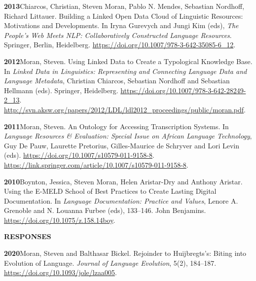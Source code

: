 \documentclass[11pt]{article}
\newcommand{\hangpara}{
 \setlength{\parindent}{0in} %
 \hangindent=0.42in %
}
\begin{document}
\vskip 6pt
\hangpara
{\bf 2013}\hspace{1ex}Chiarcos, Christian, Steven Moran, Pablo N. Mendes, Sebastian Nordhoff, Richard Littauer. Building a Linked Open Data Cloud of Linguistic Resources: Motivations and Developments. In Iryna Gurevych and Jungi Kim (eds), {\it The People's Web Meets NLP: Collaboratively Constructed Language Resources}. Springer, Berlin, Heidelberg. \url{https://doi.org/10.1007/978-3-642-35085-6_12}.


\vskip 6pt
\hangpara
{\bf 2012}\hspace{1ex}Moran, Steven. Using Linked Data to Create a Typological Knowledge Base. In {\it Linked Data in Linguistics: Representing and Connecting Language Data and Language Metadata}, Christian Chiarcos, Sebastian Nordhoff and Sebastian Hellmann (eds). Springer, Heidelberg. \url{https://doi.org/10.1007/978-3-642-28249-2_13}. \url{http://svn.aksw.org/papers/2012/LDL/ldl2012_proceedings/public/moran.pdf}.

\vskip 6pt
\hangpara
{\bf 2011}\hspace{1ex}Moran, Steven. An Ontology for Accessing Transcription Systems. In {\it Language Resources \& Evaluation: Special Issue on African Language Technology}, Guy De Pauw, Laurette Pretorius, Gilles-Maurice de Schryver and Lori Levin (eds). \url{https://doi.org/10.1007/s10579-011-9158-8}. \url{https://link.springer.com/article/10.1007/s10579-011-9158-8}.%

\vskip 6pt
\hangpara
{\bf 2010}\hspace{1ex}Boynton, Jessica, Steven Moran, Helen Aristar-Dry and Anthony Aristar. Using the E-MELD School of Best Practices to Create Lasting Digital Documentation. In {\it Language Documentation: Practice and Values}, Lenore A. Grenoble and N. Louanna Furbee (eds), 133--146. John Benjamins. \url{https://doi.org/10.1075/z.158.14boy}.



\vskip 20pt
\begin{flushleft}
{\bf RESPONSES}
\end{flushleft}

\hangpara
{\bf 2020}\hspace{1ex}Moran, Steven and Balthasar Bickel. Rejoinder to Huijbregts’s: Biting into Evolution of Language. \textit{Journal of Language Evolution}, 5(2), 184--187. \url{https://doi.org/10.1093/jole/lzaa005}.
\end{document}
